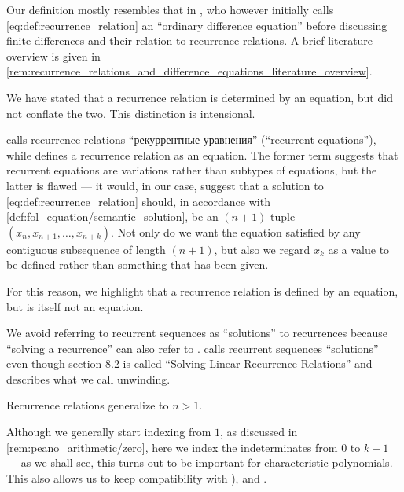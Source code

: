 \begin{comments}
  \item Our definition mostly resembles that in \cite[3]{LevyLessman1961FiniteDifferenceEquations}, who however initially calls \eqref{eq:def:recurrence_relation} an \enquote{ordinary difference equation} before discussing \hyperref[def:finite_difference_operator]{finite differences} and their relation to recurrence relations. A brief literature overview is given in \cref{rem:recurrence_relations_and_difference_equations_literature_overview}.

  \item We have stated that a recurrence relation is determined by an equation, but did not conflate the two. This distinction is intensional.

  \textcite[21]{Юмагулов2015ДинамическиеСистемы} calls recurrence relations \enquote{рекуррентные уравнения} (\enquote{recurrent equations}), while \textcite[def. 2.4.4]{Rosen2019DiscreteMathematics} defines a recurrence relation as an equation. The former term suggests that recurrent equations are variations rather than subtypes of equations, but the latter is flawed --- it would, in our case, suggest that a solution to \eqref{eq:def:recurrence_relation} should, in accordance with \cref{def:fol_equation/semantic_solution}, be an \( (n + 1) \)-tuple \( (x_n, x_{n+1}, \ldots, x_{n+k}) \). Not only do we want the equation satisfied by any contiguous subsequence of length \( (n + 1) \), but also we regard \( x_k \) as a value to be defined rather than something that has been given.

  For this reason, we highlight that a recurrence relation is defined by an equation, but is itself not an equation.

  \item We avoid referring to recurrent sequences as \enquote{solutions} to recurrences because \enquote{solving a recurrence} can also refer to . \Textcite[def. 2.4.4]{Rosen2019DiscreteMathematics} calls recurrent sequences \enquote{solutions} even though section 8.2 is called \enquote{Solving Linear Recurrence Relations} and describes what we call unwinding.

  \item Recurrence relations generalize  to \( n > 1 \).

  \item Although we generally start indexing from \( 1 \), as discussed in \cref{rem:peano_arithmetic/zero}, here we index the indeterminates from \( 0 \) to \( k - 1 \) --- as we shall see, this turns out to be important for \hyperref[def:linear_recurrence_characteristic_polynomial]{characteristic polynomials}. This also allows us to keep compatibility with \textcite[395]{LidlNiederreiter1997FiniteFields}), \textcite[def. 2.4.4]{Rosen2019DiscreteMathematics} and \textcite[21]{Юмагулов2015ДинамическиеСистемы}.


\end{comments}
